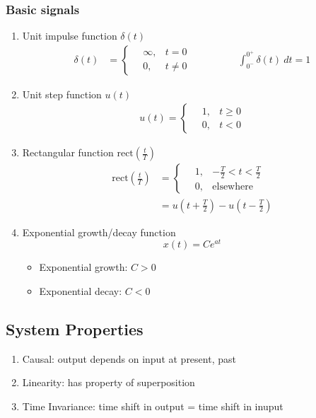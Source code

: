 \documentclass[a4paper]{article}
\begin{document}
\subsubsection{Basic signals}
\begin{enumerate}[label=\alph*.]
    \item Unit impulse function $\delta(t)$
        \begin{align*}
            \delta(t) &= \begin{cases}
            \quad \infty, & t = 0\\
            \quad 0, & t \neq 0
            \end{cases}
            \hspace{2cm} \int_{0^-}^{0^+}\delta(t) \ dt = 1
        \end{align*}
    \item Unit step function $u(t)$
        \begin{align*}
            u(t) = \begin{cases}
            \quad 1, & t \geq 0\\
            \quad 0, & t < 0
            \end{cases}
        \end{align*}
    \item Rectangular function $\text{rect}\left(\frac{t}{T}\right)$
    \begin{align*}
        \text{rect}\left(\frac{t}{T}\right) &= \begin{cases}
        \quad 1, & -\frac{T}{2} < t < \frac{T}{2}\\
        \quad 0, & \text{elsewhere}
        \end{cases}\\
        &= u\left(t+\frac{T}{2}\right) - u\left(t-\frac{T}{2}\right)
    \end{align*}
    \item Exponential growth/decay function
    $$x(t) = Ce^{at}$$
    \begin{itemize}
        \item Exponential growth: $C>0$
        \item Exponential decay: $C<0$
    \end{itemize}
\end{enumerate}
\subsection{System Properties}
\begin{enumerate}
    \item Causal: output depends on input at present, past
    \item Linearity: has property of superposition
    \item Time Invariance: time shift in output = time shift in inuput
\end{enumerate}
\end{document}
